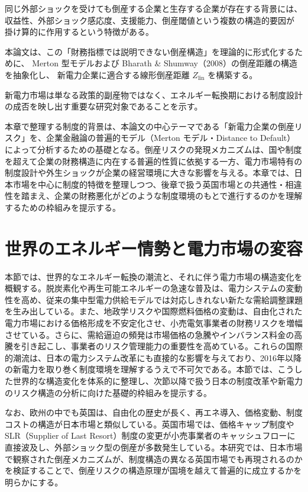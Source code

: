 同じ外部ショックを受けても倒産する企業と生存する企業が存在する背景には、
収益性、外部ショック感応度、支援能力、倒産閾値という複数の構造的要因が
掛け算的に作用するという特徴がある。

本論文は、この「財務指標では説明できない倒産構造」を理論的に形式化するために、
Merton 型モデルおよび Bharath \& Shumway（2008）の倒産距離の構造を抽象化し、
新電力企業に適合する線形倒産距離 $Z_{\text{lin}}$ を構築する。


新電力市場は単なる政策的副産物ではなく、エネルギー転換期における制度設計の成否を映し出す重要な研究対象であることを示す。

本章で整理する制度的背景は、本論文の中心テーマである「新電力企業の倒産リスク」を、企業金融論の普遍的モデル（Merton モデル・Distance to Default）によって分析するための基礎となる。倒産リスクの発現メカニズムは、国や制度を超えて企業の財務構造に内在する普遍的性質に依拠する一方、電力市場特有の制度設計や外生ショックが企業の経営環境に大きな影響を与える。本章では、日本市場を中心に制度的特徴を整理しつつ、後章で扱う英国市場との共通性・相違性を踏まえ、企業の財務悪化がどのような制度環境のもとで進行するのかを理解するための枠組みを提示する。


\section{世界のエネルギー情勢と電力市場の変容}

本節では、世界的なエネルギー転換の潮流と、それに伴う電力市場の構造変化を概観する。脱炭素化や再生可能エネルギーの急速な普及は、電力システムの変動性を高め、従来の集中型電力供給モデルでは対応しきれない新たな需給調整課題を生み出している。また、地政学リスクや国際燃料価格の変動は、自由化された電力市場における価格形成を不安定化させ、小売電気事業者の財務リスクを増幅させている。さらに、需給逼迫の頻発は市場価格の急騰やインバランス料金の高騰を引き起こし、事業者のリスク管理能力の重要性を高めている。これらの国際的潮流は、日本の電力システム改革にも直接的な影響を与えており、2016年以降の新電力を取り巻く制度環境を理解するうえで不可欠である。本節では、こうした世界的な構造変化を体系的に整理し、次節以降で扱う日本の制度改革や新電力のリスク構造の分析に向けた基礎的枠組みを提示する。

なお、欧州の中でも英国は、自由化の歴史が長く、再エネ導入、価格変動、制度コストの構造が日本市場と類似している。英国市場では、価格キャップ制度や SLR（Supplier of Last Resort）制度の変更が小売事業者のキャッシュフローに直接波及し、外部ショック型の倒産が多数発生している。本研究では、日本市場で観察された倒産メカニズムが、制度構造の異なる英国市場でも再現されるのかを検証することで、倒産リスクの構造原理が国境を越えて普遍的に成立するかを明らかにする。


